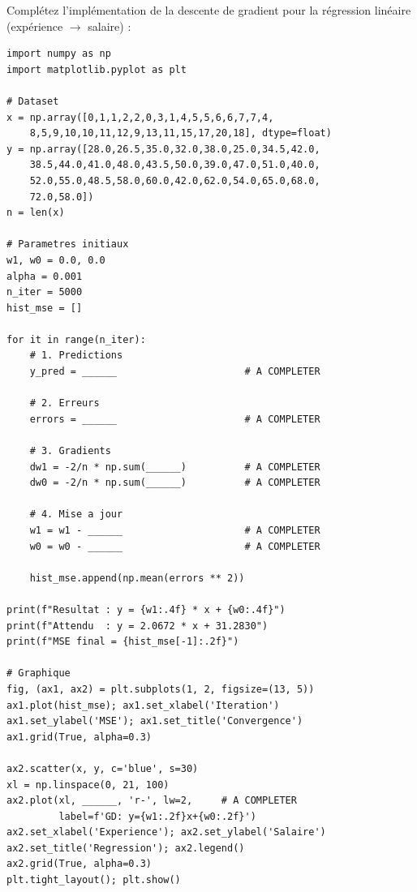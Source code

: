 
Compl\'{e}tez l'impl\'{e}mentation de la descente de gradient pour la r\'{e}gression
lin\'{e}aire (exp\'{e}rience $\to$ salaire) :

\begin{pythonbox}
\begin{lstlisting}
import numpy as np
import matplotlib.pyplot as plt

# Dataset
x = np.array([0,1,1,2,2,0,3,1,4,5,5,6,6,7,7,4,
    8,5,9,10,10,11,12,9,13,11,15,17,20,18], dtype=float)
y = np.array([28.0,26.5,35.0,32.0,38.0,25.0,34.5,42.0,
    38.5,44.0,41.0,48.0,43.5,50.0,39.0,47.0,51.0,40.0,
    52.0,55.0,48.5,58.0,60.0,42.0,62.0,54.0,65.0,68.0,
    72.0,58.0])
n = len(x)

# Parametres initiaux
w1, w0 = 0.0, 0.0
alpha = 0.001
n_iter = 5000
hist_mse = []

for it in range(n_iter):
    # 1. Predictions
    y_pred = ______                      # A COMPLETER

    # 2. Erreurs
    errors = ______                      # A COMPLETER

    # 3. Gradients
    dw1 = -2/n * np.sum(______)          # A COMPLETER
    dw0 = -2/n * np.sum(______)          # A COMPLETER

    # 4. Mise a jour
    w1 = w1 - ______                     # A COMPLETER
    w0 = w0 - ______                     # A COMPLETER

    hist_mse.append(np.mean(errors ** 2))

print(f"Resultat : y = {w1:.4f} * x + {w0:.4f}")
print(f"Attendu  : y = 2.0672 * x + 31.2830")
print(f"MSE final = {hist_mse[-1]:.2f}")

# Graphique
fig, (ax1, ax2) = plt.subplots(1, 2, figsize=(13, 5))
ax1.plot(hist_mse); ax1.set_xlabel('Iteration')
ax1.set_ylabel('MSE'); ax1.set_title('Convergence')
ax1.grid(True, alpha=0.3)

ax2.scatter(x, y, c='blue', s=30)
xl = np.linspace(0, 21, 100)
ax2.plot(xl, ______, 'r-', lw=2,     # A COMPLETER
         label=f'GD: y={w1:.2f}x+{w0:.2f}')
ax2.set_xlabel('Experience'); ax2.set_ylabel('Salaire')
ax2.set_title('Regression'); ax2.legend()
ax2.grid(True, alpha=0.3)
plt.tight_layout(); plt.show()
\end{lstlisting}
\end{pythonbox}


